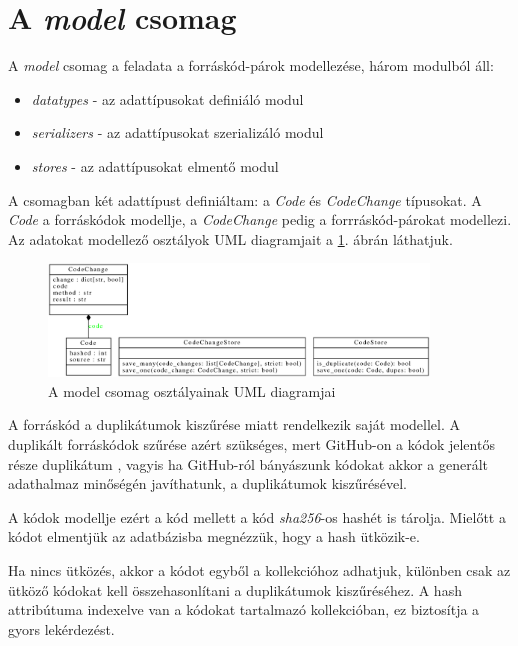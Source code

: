 \section{A \emph{model} csomag}
\label{sec:model}

A \emph{model} csomag a feladata a forráskód-párok modellezése, három modulból áll:

\begin{itemize}
	\item \emph{datatypes} - az adattípusokat definiáló modul
	\item \emph{serializers} - az adattípusokat szerializáló modul
	\item \emph{stores} - az adattípusokat elmentő modul
\end{itemize}

A csomagban két adattípust definiáltam: a \emph{Code} és \emph{CodeChange} típusokat.
A \emph{Code} a forráskódok modellje, a \emph{CodeChange} pedig a forrráskód-párokat modellezi.
Az adatokat modellező osztályok UML diagramjait a \ref{fig:model}. ábrán láthatjuk.

\begin{figure}[H]
	\centering
	\includegraphics[width=0.9\textwidth]{images/uml/models.eps}
	\caption{\label{fig:model}A model csomag osztályainak UML diagramjai}
\end{figure}

A forráskód a duplikátumok kiszűrése miatt rendelkezik saját modellel.
A duplikált forráskódok szűrése azért szükséges, mert GitHub-on a kódok jelentős része duplikátum
\cite{GitHubDuplication},
vagyis ha GitHub-ról bányászunk kódokat akkor a generált adathalmaz minőségén javíthatunk,
a duplikátumok kiszűrésével.

A kódok modellje ezért a kód mellett a kód \emph{sha256}-os hashét is tárolja.
Mielőtt a kódot elmentjük az adatbázisba megnézzük, hogy a hash ütközik-e.

Ha nincs ütközés, akkor a kódot egyből a kollekcióhoz adhatjuk,
különben csak az ütköző kódokat kell összehasonlítani a duplikátumok kiszűréséhez.
A hash attribútuma indexelve van a kódokat tartalmazó kollekcióban,
ez biztosítja a gyors lekérdezést.

